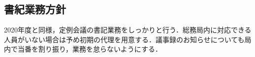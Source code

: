 \subsection*{書紀業務方針}


2020年度と同様，定例会議の書記業務をしっかりと行う．総務局内に対応できる人員がいない場合は予め初期の代理を用意する．議事録のお知らせについても局内で当番を割り振り，業務を怠らないようにする．
